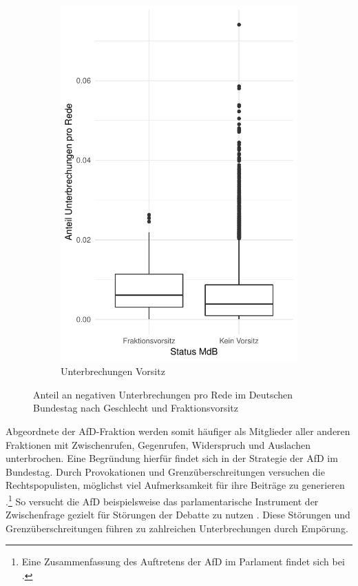 \documentclass[12pt, 
    twoside=false, 
    bibliography=totoc, 
    numbers=endperiod, 
    headings=normal, 
    toc=chapterentrydotfill
    ]{scrbook}
\begin{document}
\begin{figure}[H]
\begin{subfigure}{.5\textwidth}
      \includegraphics[width=.9\linewidth]{images/boxplot_unterbrechung_vorsitz.pdf}
      \caption{Unterbrechungen Vorsitz}
      \label{fig:boxplot_unterbrechung_vorsitz}
    \end{subfigure}
    \caption[Anteil an negativen Unterbrechungen pro Rede im 19. Deutschen Bundestag]{Anteil an negativen Unterbrechungen pro Rede im Deutschen Bundestag nach Geschlecht und Fraktionsvorsitz}
    \label{fig:boxplot_unterbrechung}
\end{figure}

Abgeordnete der AfD-Fraktion werden somit häufiger als Mitglieder aller anderen Fraktionen mit Zwischenrufen, Gegenrufen, Widerspruch und Auslachen unterbrochen. Eine Begründung hierfür findet sich in der Strategie der AfD im Bundestag. Durch Provokationen und Grenzüberschreitungen versuchen die Rechtspopulisten, möglichst viel Aufmerksamkeit für ihre Beiträge zu generieren \parencite[vgl.][3ff.]{ruhose_2019}.\footnote{Eine Zusammenfassung des Auftretens der AfD im Parlament findet sich bei \textcite{ruhose_2019}.} So versucht die AfD beispielsweise das parlamentarische Instrument der Zwischenfrage gezielt für Störungen der Debatte zu nutzen \parencite[5]{ruhose_2019}. Diese Störungen und Grenzüberschreitungen führen zu zahlreichen Unterbrechungen durch Empörung. 
\end{document}
